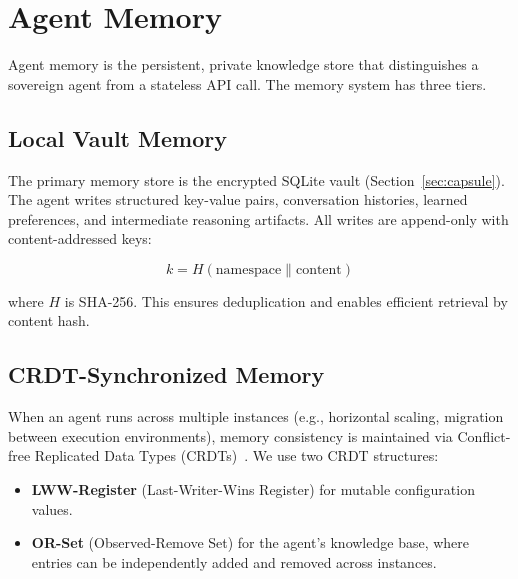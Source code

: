 

\section{Agent Memory}
\label{sec:memory}

Agent memory is the persistent, private knowledge store that distinguishes a sovereign agent from a stateless API call. The memory system has three tiers.

\subsection{Local Vault Memory}

The primary memory store is the encrypted SQLite vault (Section~\ref{sec:capsule}). The agent writes structured key-value pairs, conversation histories, learned preferences, and intermediate reasoning artifacts. All writes are append-only with content-addressed keys:

\begin{equation}\label{eq:memory-key}
    k = H(\text{namespace} \| \text{content})
\end{equation}

where $H$ is SHA-256. This ensures deduplication and enables efficient retrieval by content hash.

\subsection{CRDT-Synchronized Memory}

When an agent runs across multiple instances (e.g., horizontal scaling, migration between execution environments), memory consistency is maintained via Conflict-free Replicated Data Types (CRDTs)~\cite{shapiro2011crdts}. We use two CRDT structures:

\begin{itemize}
    \item \textbf{LWW-Register} (Last-Writer-Wins Register) for mutable configuration values.
    \item \textbf{OR-Set} (Observed-Remove Set) for the agent's knowledge base, where entries can be independently added and removed across instances.
\end{itemize}

